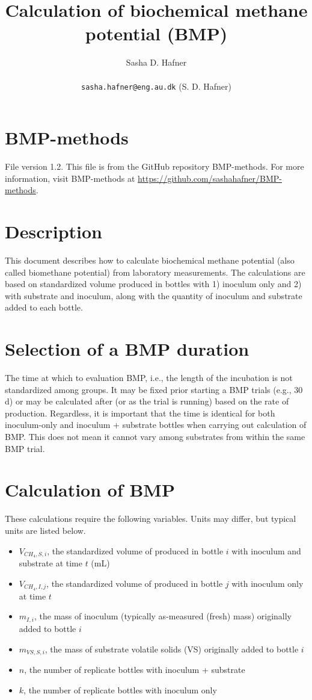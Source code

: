 \documentclass[]{article}
\title {Calculation of biochemical methane potential (BMP)}
\author{Sasha D. Hafner\\
\\
\texttt{sasha.hafner@eng.au.dk} (S. D. Hafner)
}
\begin{document}
\maketitle

\section{BMP-methods}
File version 1.2. 
This file is from the GitHub repository BMP-methods.
For more information, visit BMP-methods at \url{https://github.com/sashahafner/BMP-methods}.

\section{Description}
This document describes how to calculate biochemical methane potential (also called biomethane potential) from laboratory measurements.
The calculations are based on standardized  volume produced in bottles with 1) inoculum only and 2) with substrate and inoculum, along with the quantity of inoculum and substrate added to each bottle.

\section{Selection of a BMP duration}
The time at which to evaluation BMP, i.e., the length of the incubation is not standardized among groups.
It may be fixed prior starting a BMP trials (e.g., 30 d) or may be calculated after (or as the trial is running) based on the rate of  production.
Regardless, it is important that the time is identical for both inoculum-only and inoculum + substrate bottles when carrying out calculation of BMP.
This does not mean it cannot vary among substrates from within the same BMP trial.

\section{Calculation of BMP}

These calculations require the following variables.
Units may differ, but typical units are listed below.
\begin{itemize}
  \item $V_{CH_4, S, i}$, the standardized volume of  produced in bottle $i$ with inoculum and substrate at time $t$ (mL)
  \item $V_{CH_4, I, j}$, the standardized volume of  produced in bottle $j$ with inoculum only at time $t$
  \item $m_{I, i}$, the mass of inoculum (typically as-measured (fresh) mass) originally added to bottle $i$
  \item $m_{VS, S, i}$, the mass of substrate volatile solids (VS) originally added to bottle $i$
  \item $n$, the number of replicate bottles with inoculum + substrate
  \item $k$, the number of replicate bottles with inoculum only
\end{itemize}
\end{document}

